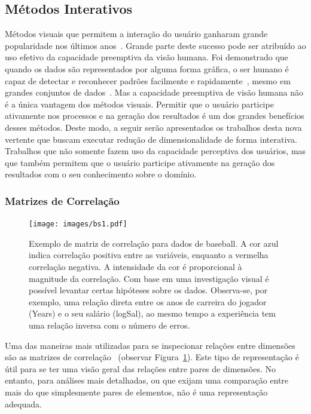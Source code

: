 \subsection{Métodos Interativos}\label{ss:int}

Métodos visuais que permitem a interação do usuário ganharam
grande popularidade nos últimos anos~\cite{State2012}.
Grande parte deste sucesso pode ser atribuído ao uso efetivo
da capacidade preemptiva da visão humana. Foi demonstrado
que quando os dados são representados por alguma forma
gráfica, o ser humano é capaz de detectar e reconhecer
padrões facilmente e rapidamente~\cite{Healey1995}, mesmo em
grandes conjuntos de dados~\cite{Fodor2002}. Mas a
capacidade preemptiva de visão humana não é a única vantagem
dos métodos visuais. Permitir que o usuário participe
ativamente nos processos e na geração dos resultados é um
dos grandes benefícios desses métodos. Deste
modo, a seguir serão apresentados os trabalhos desta nova
vertente que buscam executar redução de dimensionalidade de
forma interativa. Trabalhos que não somente fazem uso da
capacidade perceptiva dos usuários, mas que também permitem
que o usuário participe ativamente na geração dos resultados
com o seu conhecimento sobre o domínio.

\subsubsection{Matrizes de Correlação}\label{sss:cormat}

\begin{figure}[h!]
    \centering
    \texttt{[image: images/bs1.pdf]}
    \caption[Matrizes de Correlação]{Exemplo de matriz de
    correlação para dados de baseball. A cor azul indica
correlação positiva entre as variáveis, enquanto a vermelha
correlação negativa. A intensidade da cor é proporcional à
magnitude da correlação. Com base em uma investigação visual
é possível levantar certas hipóteses sobre os dados.
Observa-se, por exemplo, uma relação direta entre os anos de
carreira do jogador (Years) e o seu salário (logSal), ao
mesmo tempo a experiência tem uma relação inversa com o
número de erros.} 
    \label{fig:bs1}
\end{figure}

Uma das maneiras mais utilizadas para se inspecionar
relações entre dimensões são as matrizes de
correlação~\cite{Friendly2002} (observar
Figura~\ref{fig:bs1}). Este tipo de representação é útil
para se ter uma visão geral das relações entre pares de
dimensões. No entanto, para análises mais detalhadas, ou que
exijam uma comparação entre mais do que simplesmente pares
de elementos, não é uma representação adequada.

